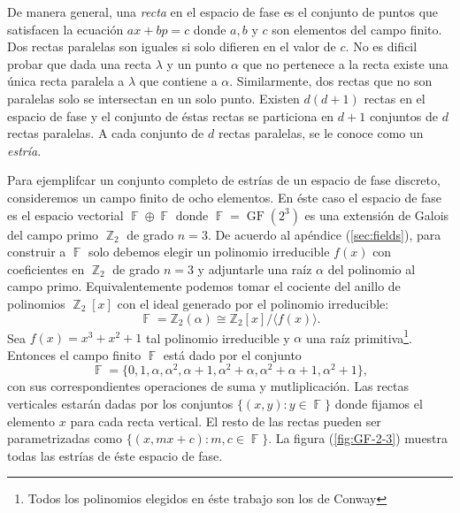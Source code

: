 \documentclass[a4paper]{report}
\DeclareMathOperator{\Z}{\mathbb{Z}}
\DeclareMathOperator{\F}{\mathbb{F}}
\DeclareMathOperator{\GF}{GF}
\begin{document}
  De manera general, una \textit{recta} en el espacio
  de fase es el conjunto de puntos que satisfacen la
  ecuación $ax + bp = c$ donde $a,b$ y $c$ son elementos del
  campo finito. Dos rectas paralelas son iguales si solo
  difieren en el valor de $c$.  No es dificil probar que
  dada una recta $\lambda$ y un punto $\alpha$ que no
  pertenece a la recta existe una única recta paralela a
  $\lambda$ que contiene a $\alpha$.  Similarmente, dos
  rectas que no son paralelas solo se intersectan en un solo
  punto. Existen $d(d+1)$ rectas en el espacio de fase y el
  conjunto de éstas rectas se particiona en $d+1$ conjuntos
  de $d$ rectas paralelas. A cada conjunto de $d$ rectas
  paralelas, se le conoce como un \textit{estría}. 

  Para ejemplifcar un conjunto completo de estrías de un
  espacio de fase discreto, consideremos un campo finito de
  ocho elementos. En éste caso el espacio de fase es el
  espacio vectorial $\F \oplus \F$ donde $\F =
  \GF\left(2^3\right)$ es una extensión de Galois del campo
  primo $\Z_2$ de grado $n = 3$. De acuerdo al apéndice
  (\ref{sec:fields}), para construir a $\F$ solo debemos
  elegir un polinomio irreducible $f(x)$ con coeficientes en
  $\Z_2$ de grado $n = 3$ y adjuntarle una raíz $\alpha$ del
  polinomio al campo primo. Equivalentemente podemos tomar
  el cociente del anillo de polinomios $\Z_2[x]$ con el
  ideal generado por el polinomio irreducible:
  \begin{equation}
    \F
    = \mathbb Z_2(\alpha)
    \cong \mathbb Z_2[x] / \langle f(x) \rangle.
  \end{equation} 
  Sea $f(x) = x^3+x^2+1$ tal polinomio irreducible y
  $\alpha$ una raíz primitiva\footnote{Todos los polinomios
  elegidos en éste trabajo son los de Conway}. Entonces el
  campo finito $\F$ está dado por el conjunto
  \begin{equation}
    \F
    = \{
      0, 1, \alpha, \alpha^2, \alpha+1, \alpha^2+\alpha,
      \alpha^2 + \alpha + 1, \alpha^2 + 1
    \},
  \end{equation} 
  con sus correspondientes operaciones de suma y
  mutliplicación. Las rectas verticales estarán dadas por
  los conjuntos $\{(x,y) : y \in \F\}$ donde fijamos el
  elemento $x$ para cada recta vertical. El resto de las
  rectas pueden ser parametrizadas como $\{(x,mx+c) : m, c
  \in \F\}$. La figura (\ref{fig:GF-2-3}) muestra todas las
  estrías de éste espacio de fase.
\end{document}
